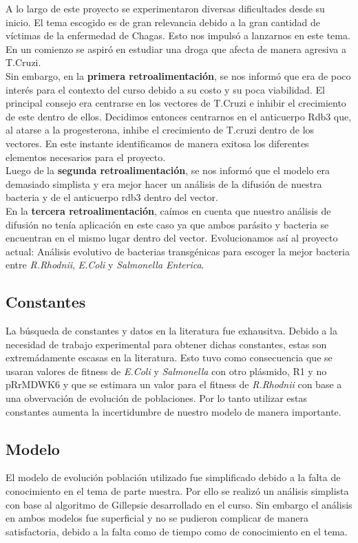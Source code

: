 \documentclass[12pt]{article}
\numberwithin{equation}{section}
\begin{document}
A lo largo de este proyecto se experimentaron diversas dificultades desde su inicio. El tema escogido es de gran relevancia debido a la gran cantidad de víctimas de la enfermedad de Chagas. Esto nos impulsó a lanzarnos en este tema. En un comienzo se aspiró en estudiar una droga que afecta de manera agresiva a T.Cruzi. \\
Sin embargo, en la \textbf{primera retroalimentación}, se nos informó que era de poco interés para el contexto del curso debido a su costo y su poca viabilidad. El principal consejo era centrarse en los vectores de T.Cruzi e inhibir el crecimiento de este dentro de ellos. Decidimos entonces centrarnos en el anticuerpo Rdb3 que, al atarse a la progesterona, inhibe el crecimiento de T.cruzi dentro de los vectores. En este instante identificamos de manera exitosa los diferentes elementos necesarios para el proyecto.\\ Luego de la \textbf{segunda retroalimentación}, se nos informó que el modelo era demasiado simplista y era mejor hacer un análisis de la difusión de nuestra bacteria y de el anticuerpo rdb3 dentro del vector. \\
En la \textbf{tercera retroalimentación}, caímos en cuenta que nuestro análisis de difusión no tenía aplicación en este caso ya que ambos parásito y bacteria se encuentran en el mismo lugar dentro del vector.
Evolucionamos así al proyecto actual: Análisis evolutivo de bacterias transgénicas para escoger la mejor bacteria entre \textit{R.Rhodnii}, \textit{E.Coli} y \textit{Salmonella Enterica}.\\

\subsection{Constantes}
La búsqueda de constantes y datos en la literatura fue exhausitva. Debido a la necesidad de trabajo experimental para obtener dichas constantes, estas son extremádamente escasas en la literatura. Esto tuvo como consecuencia que se usaran valores de fitness de \textit{E.Coli} y \textit{Salmonella} con otro plásmido, R1 y no pRrMDWK6 y que se estimara un valor para el fitness de \textit{R.Rhodnii} con base a una obvervación de evolución de poblaciones. Por lo tanto utilizar estas constantes aumenta la incertidumbre de nuestro modelo de manera importante.

\subsection{Modelo}
El modelo de evolución población utilizado fue simplificado debido a la falta de conocimiento en el tema de parte nuestra. Por ello se realizó un análisis simplista con base al algoritmo de Gillepsie desarrollado en el curso. Sin embargo el análisis en ambos modelos fue superficial y no se pudieron complicar de manera satisfactoria, debido a la falta como de tiempo como de conocimiento en el tema.
\end{document}
